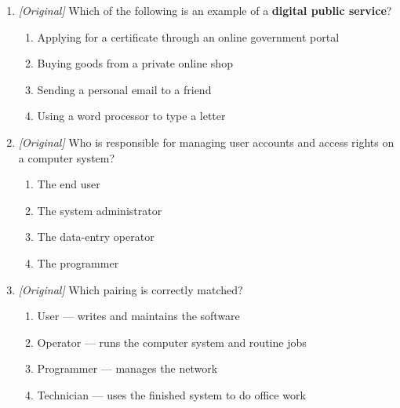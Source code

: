\documentclass[11pt]{article}
\begin{document}
\begin{enumerate}[label=\textbf{Q\arabic*.}, leftmargin=*]
  authentication factor?
  \begin{enumerate}[label=\Alph*.]
    \item Something you know
    \item Something you have
    \item Something you are
    \item Something you forget
  \end{enumerate}
\item \textit{[Original]} Which of the following is an example of a
  \textbf{digital public service}?
  \begin{enumerate}[label=\Alph*.]
    \item Applying for a certificate through an online government portal
    \item Buying goods from a private online shop
    \item Sending a personal email to a friend
    \item Using a word processor to type a letter
  \end{enumerate}
\item \textit{[Original]} Who is responsible for managing user accounts and
  access rights on a computer system?
  \begin{enumerate}[label=\Alph*.]
    \item The end user
    \item The system administrator
    \item The data-entry operator
    \item The programmer
  \end{enumerate}
\item \textit{[Original]} Which pairing is correctly matched?
  \begin{enumerate}[label=\Alph*.]
    \item User --- writes and maintains the software
    \item Operator --- runs the computer system and routine jobs
    \item Programmer --- manages the network
    \item Technician --- uses the finished system to do office work
  \end{enumerate}


\end{enumerate}
\end{document}
